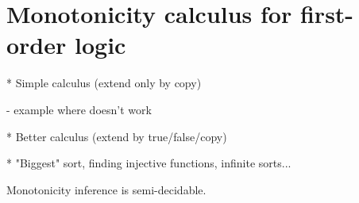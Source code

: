 \section{Monotonicity calculus for first-order logic}

* Simple calculus (extend only by copy)

- example where doesn't work

* Better calculus (extend by true/false/copy)


* "Biggest" sort, finding injective functions, infinite sorts...


Monotonicity inference is semi-decidable.




